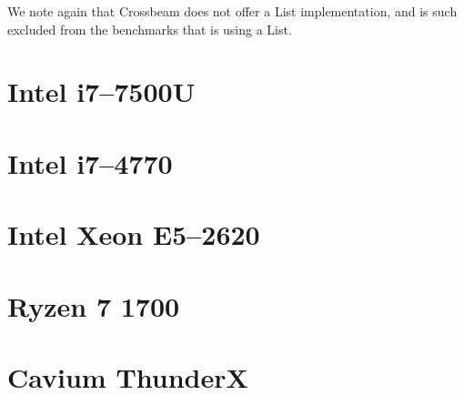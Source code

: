 \documentclass[b5paper]{report}
\begin{document}
\begin{appendices}
We note again that Crossbeam does not offer a List implementation, and is such
excluded from the benchmarks that is using a List.


\clearpage
\section{Intel\textregistered{} i7--7500U}
\begin{figure}[ht]
\end{figure}

\clearpage
\section{Intel\textregistered{} i7--4770}
\begin{figure}[ht]
\end{figure}

\clearpage
\section{Intel\textregistered{} Xeon\textregistered{} E5--2620}
\begin{figure}[ht]
\end{figure}

\clearpage
\section{Ryzen 7 1700}
\begin{figure}[ht]
\end{figure}

\clearpage
\section{Cavium ThunderX}
\begin{figure}[ht]
\end{figure}



\end{appendices}
\end{document}
